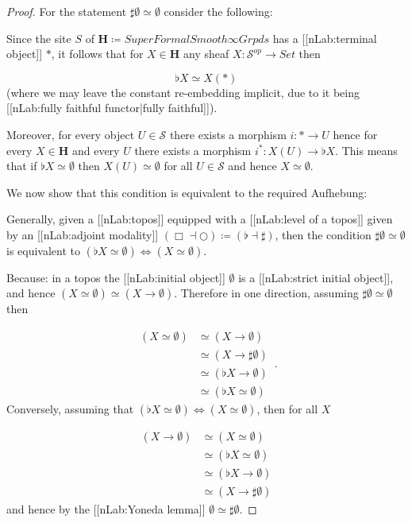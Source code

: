 \documentclass[12pt,titlepage]{article}
\theoremstyle{plain}
\theoremstyle{definition}
\theoremstyle{remark}
\begin{document}
\begin{proof}
For the statement $\sharp \emptyset \simeq \emptyset$ consider the following:

Since the site $S$ of $\mathbf{H} \coloneqq SuperFormalSmooth\infty Grpds$ has a [[nLab:terminal object]] $\ast$, it follows that for $X\in \mathbf{H}$ any sheaf $X \colon \mathcal{S}^{op}\to Set$ then

\begin{displaymath}
\flat X \simeq X(\ast)
\end{displaymath}
(where we may leave the constant re-embedding implicit, due to it being [[nLab:fully faithful functor|fully faithful]]).

Moreover, for every object $U\in \mathcal{S}$ there exists a morphism $i \colon \ast \to U$ hence for every $X\in \mathbf{H}$ and every $U$ there exists a morphism $i^\ast \colon X(U)\to \flat X$. This means that if $\flat X \simeq \emptyset$ then $X(U) \simeq \emptyset$ for all $U \in \mathcal{S}$ and hence $X\simeq \emptyset$.

We now show that this condition is equivalent to the required Aufhebung:

Generally, given a [[nLab:topos]] equipped with a [[nLab:level of a topos]] given by an [[nLab:adjoint modality]] $(\Box\dashv \bigcirc) \coloneqq (\flat \dashv \sharp)$, then the condition $\sharp \emptyset \simeq \emptyset$ is equivalent to $(\flat X \simeq \emptyset) \Leftrightarrow (X \simeq \emptyset)$.

Because: in a topos the [[nLab:initial object]] $\emptyset$ is a [[nLab:strict initial object]], and hence $(X \simeq \emptyset) \simeq (X \to \emptyset)$. Therefore in one direction, assuming $\sharp \emptyset \simeq \emptyset$ then

\begin{displaymath}
\begin{aligned}
    (X \simeq \emptyset)
    & \simeq
    (X \to \emptyset)
    \\
    & \simeq (X \to \sharp \emptyset)
    \\
    & \simeq (\flat X \to \emptyset)
    \\
    & \simeq (\flat X \simeq \emptyset)
  \end{aligned}
  \,.
\end{displaymath}
Conversely, assuming that $(\flat X \simeq \emptyset) \Leftrightarrow (X \simeq \emptyset)$, then for all $X$

\begin{displaymath}
\begin{aligned}
    (X\to \emptyset)
    & \simeq
    (X\simeq \emptyset)
   \\
    & \simeq (\flat X \simeq \emptyset)
    \\
    & \simeq (\flat X \to \emptyset)
    \\
    & \simeq (X\to \sharp \emptyset)
  \end{aligned}
\end{displaymath}
and hence by the [[nLab:Yoneda lemma]] $\emptyset \simeq \sharp \emptyset$.


\end{proof}
\end{document}
